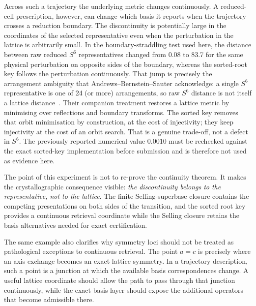 \documentclass[11pt]{article}
\begin{document}
Across such a trajectory the underlying metric changes continuously. A reduced-cell prescription, however, can change which basis it reports when the trajectory crosses a reduction boundary. The discontinuity is potentially large in the coordinates of the selected representative even when the perturbation in the lattice is arbitrarily small. In the boundary-straddling test used here, the distance between raw reduced $S^6$ representatives changed from 0.08 to 83.7 for the same physical perturbation on opposite sides of the boundary, whereas the sorted-root key follows the perturbation continuously. That jump is precisely the arrangement ambiguity that Andrews--Bernstein--Sauter acknowledge: a single $S^6$ representative is one of 24 (or more) arrangements, so raw $S^6$ distance is not itself a lattice distance~\cite{abs2019}. Their companion treatment restores a lattice metric by minimising over reflections and boundary transforms. The sorted key removes that orbit minimisation by construction, at the cost of injectivity; they keep injectivity at the cost of an orbit search. That is a genuine trade-off, not a defect in $S^6$. The previously reported numerical value 0.0010 must be rechecked against the exact sorted-key implementation before submission and is therefore not used as evidence here.

The point of this experiment is not to re-prove the continuity theorem. It makes the crystallographic consequence visible: \emph{the discontinuity belongs to the representative, not to the lattice}. The finite Selling-superbase closure contains the competing presentations on both sides of the transition, and the sorted root key provides a continuous retrieval coordinate while the Selling closure retains the basis alternatives needed for exact certification.

The same example also clarifies why symmetry loci should not be treated as pathological exceptions to continuous retrieval. The point $a=c$ is precisely where an axis exchange becomes an exact lattice symmetry. In a trajectory description, such a point is a junction at which the available basis correspondences change. A useful lattice coordinate should allow the path to pass through that junction continuously, while the exact-basis layer should expose the additional operators that become admissible there.

\end{document}
